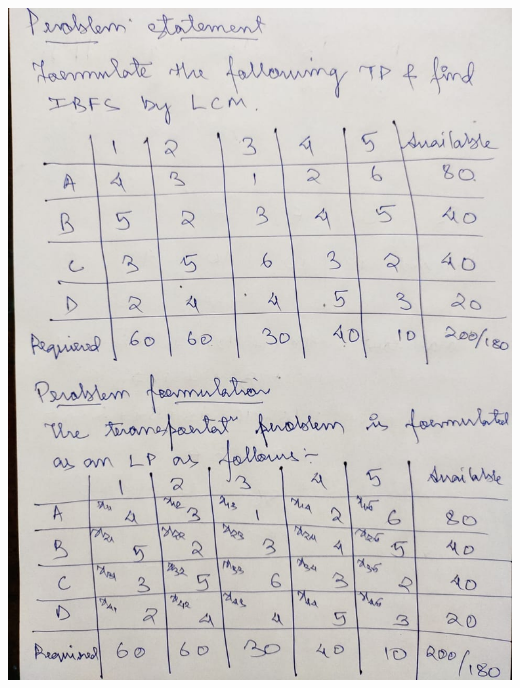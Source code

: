 \documentclass[12pt, letterpaper, twoside]{book}
\begin{document}
\begin{flushleft}
\includegraphics[width=\paperwidth, height=10in]{Page8}
\end{flushleft}
\end{document}

